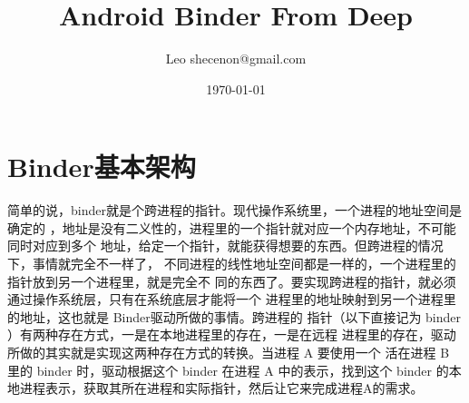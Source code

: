 \documentclass[a4paper,11pt]{article}
\title{Android Binder From Deep}
\author{Leo shecenon@gmail.com}
\date{\today}
\begin{document}
\maketitle
\renewcommand{\refname}{参考文献}
\renewcommand\contentsname{目录}
\renewcommand\listfigurename{插图目录}
\renewcommand\listtablename{表格目录}
\renewcommand\indexname{索引}
\renewcommand\appendixname{附录}
\renewcommand\figurename{图}
\renewcommand\tablename{表}
\renewcommand{\lstlistlistingname}{代码列表集}
\renewcommand{\lstlistingname}{代码}


\setlength{\columnsep}{.8cm}
\setlength{\parskip}{1ex}
\tableofcontents
\newcommand{\various}[1]{{\color{cyan}\textit{#1}}}
\newcommand{\binder}{{\color{red}binder }}
\makeatletter
\newcommand{\figcaption}{\def\@captype{figure}\caption}
\newcommand{\tabcaption}{\def\@captype{table}\caption}
\makeatother

\setlength{\leftmargin}{1.2em}     %
\setlength{\parsep}{0ex}         %
\setlength{\topsep}{1ex}         %
\setlength{\itemsep}{0.5ex}        %
\setlength{\labelsep}{0.3em}     %
\setlength{\itemindent}{1.1em}    %
\setlength{\listparindent}{0em} %

\section{Binder基本架构}
简单的说，binder就是个跨进程的指针。现代操作系统里，一个进程的地址空间是确定的
，地址是没有二义性的，进程里的一个指针就对应一个内存地址，不可能同时对应到多个
地址，给定一个指针，就能获得想要的东西。但跨进程的情况下，事情就完全不一样了，
不同进程的线性地址空间都是一样的，一个进程里的指针放到另一个进程里，就是完全不
同的东西了。要实现跨进程的指针，就必须通过操作系统层，只有在系统底层才能将一个
进程里的地址映射到另一个进程里的地址，这也就是 Binder驱动所做的事情。跨进程的
指针（以下直接记为 \binder ）有两种存在方式，一是在本地进程里的存在，一是在远程
进程里的存在，驱动所做的其实就是实现这两种存在方式的转换。当进程 A 要使用一个
活在进程 B 里的 \binder 时，驱动根据这个 \binder 在进程 A 中的表示，找到这个
\binder 的本地进程表示，获取其所在进程和实际指针，然后让它来完成进程A的需求。
\end{document}
